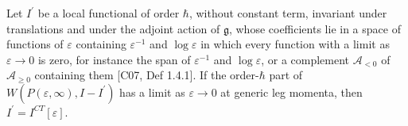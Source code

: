 \begin{proposition}
\label{prop:c4-unique}
Let $I^{\prime}$ be a local functional of order $\hbar$, without constant term, invariant under translations and under the adjoint action of $\mathfrak g$, whose coefficients lie in a space of functions of $\varepsilon$ containing $\varepsilon^{-1}$ and $\log\varepsilon$ in which every function with a limit as $\varepsilon\to0$ is zero, for instance the span of $\varepsilon^{-1}$ and $\log\varepsilon$, or a complement $\mathscr A_{<0}$ of $\mathscr A_{\ge0}$ containing them [C07, Def 1.4.1]. If the order-$\hbar$ part of $W(P(\varepsilon,\infty),I-I^{\prime})$ has a limit as $\varepsilon\to0$ at generic leg momenta, then $I^{\prime}=I^{CT}[\varepsilon]$.
\end{proposition}

